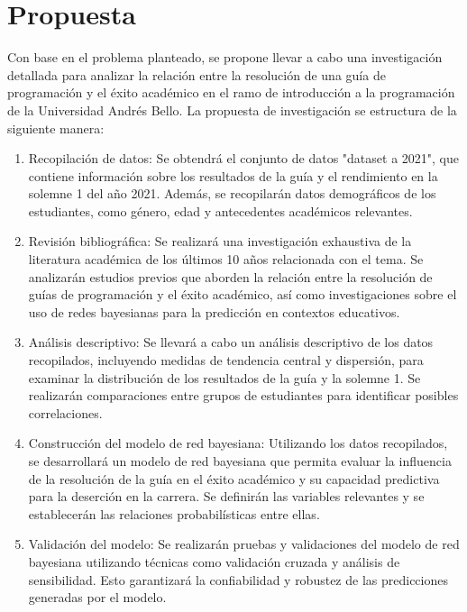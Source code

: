 \hypertarget{propuesta}{%
    \section{Propuesta}\label{propuesta}}

    \vfill
Con base en el problema planteado, se propone llevar a cabo una investigación detallada para analizar la relación entre la resolución de una guía de programación y el éxito académico en el ramo de introducción a la programación de la Universidad Andrés Bello. La propuesta de investigación se estructura de la siguiente manera:
\vfill
\begin{enumerate}
    \item Recopilación de datos: Se obtendrá el conjunto de datos "dataset a 2021", que contiene información sobre los resultados de la guía y el rendimiento en la solemne 1 del año 2021. Además, se recopilarán datos demográficos de los estudiantes, como género, edad y antecedentes académicos relevantes.

    \item Revisión bibliográfica: Se realizará una investigación exhaustiva de la literatura académica de los últimos 10 años relacionada con el tema. Se analizarán estudios previos que aborden la relación entre la resolución de guías de programación y el éxito académico, así como investigaciones sobre el uso de redes bayesianas para la predicción en contextos educativos.

    \item Análisis descriptivo: Se llevará a cabo un análisis descriptivo de los datos recopilados, incluyendo medidas de tendencia central y dispersión, para examinar la distribución de los resultados de la guía y la solemne 1. Se realizarán comparaciones entre grupos de estudiantes para identificar posibles correlaciones.

    \item Construcción del modelo de red bayesiana: Utilizando los datos recopilados, se desarrollará un modelo de red bayesiana que permita evaluar la influencia de la resolución de la guía en el éxito académico y su capacidad predictiva para la deserción en la carrera. Se definirán las variables relevantes y se establecerán las relaciones probabilísticas entre ellas.

    \item Validación del modelo: Se realizarán pruebas y validaciones del modelo de red bayesiana utilizando técnicas como validación cruzada y análisis de sensibilidad. Esto garantizará la confiabilidad y robustez de las predicciones generadas por el modelo.


\end{enumerate}
